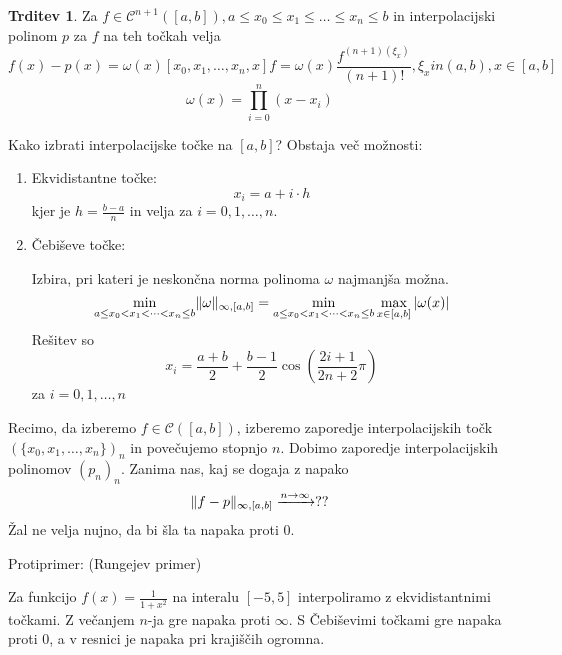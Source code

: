 \documentclass[a4paper,12pt]{article}
\DeclarePairedDelimiter\norm{\lVert}{\rVert}
\theoremstyle{definition}
\newtheorem{claim}[counter]{Trditev}
\theoremstyle{remark}
\begin{document}
\begin{claim}
    Za $f \in \mathscr{C}^{n+1}([a, b]), a \leq x_0 \leq x_1 \leq \dots \leq x_n \leq b$ in interpolacijski polinom $p$ za $f$ na teh točkah velja
    \begin{equation*}
        f(x) - p(x) = \omega(x) [x_0, x_1, \dots, x_n, x] f = \omega(x) \frac{f^{(n+1)(\xi_x)}}{(n+1)!}, \xi_x in (a, b), x \in [a, b]
    \end{equation*}
    \begin{equation*}
        \omega(x) = \prod_{i = 0}^{n} (x-x_i)
    \end{equation*}
\end{claim}

Kako izbrati interpolacijske točke na $[a, b]$? Obstaja več možnosti:
\begin{enumerate}
    \item Ekvidistantne točke:
    \begin{equation*}
        x_i = a + i \cdot h
    \end{equation*}
    kjer je $h = \frac{b-a}{n}$ in velja za $i = 0, 1, \dots, n$.

    \item Čebiševe točke:
    
    Izbira, pri kateri je neskončna norma polinoma $\omega$ najmanjša možna.
    \begin{equation*}
        \min_{a \leq x_0 < x_1 < \dots < x_n \leq b} \norm{\omega}_{\infty, [a, b]} = \min_{a \leq x_0 < x_1 < \dots < x_n \leq b} \max_{x \in [a, b]} | \omega(x) |
    \end{equation*}
    Rešitev so
    \begin{equation*}
        x_i = \frac{a+b}{2} + \frac{b-1}{2}\cos(\frac{2i+1}{2n+2}\pi)
    \end{equation*}
    za $i = 0, 1, \dots, n$
\end{enumerate}

Recimo, da izberemo $f \in \mathscr{C}([a, b])$, izberemo zaporedje interpolacijskih točk $(\{x_0, x_1, \dots, x_n\})_n$ in
povečujemo stopnjo $n$. Dobimo zaporedje interpolacijskih polinomov $(p_n)_n$. Zanima nas, kaj se dogaja z napako
\begin{equation*}
    \norm{f-p}_{\infty, [a, b]} \xrightarrow{n \to \infty} ?? 
\end{equation*}
Žal ne velja nujno, da bi šla ta napaka proti 0.

Protiprimer: (Rungejev primer)

Za funkcijo $f(x) = \frac{1}{1+x^2}$ na interalu $[-5, 5]$ interpoliramo z ekvidistantnimi točkami. Z večanjem $n$-ja gre napaka
proti $\infty$. S Čebiševimi točkami gre napaka proti 0, a v resnici je napaka pri krajiščih ogromna.
\end{document}
